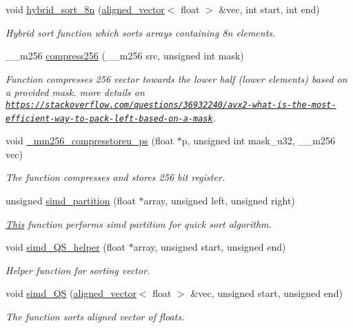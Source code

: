 \begin{DoxyCompactItemize}
void \mbox{\hyperlink{namespaceHYBRID__SORT_a3bac6bc8803474e11924ceb1bc74e1ab}{hybrid\+\_\+sort\+\_\+8n}} (\mbox{\hyperlink{type__definitions_8hpp_a087efd587d66b881646ef378f1919c90}{aligned\+\_\+vector}}$<$ float $>$ \&vec, int start, int end)
\begin{DoxyCompactList}\small\item\em Hybrid sort function which sorts arrays containing 8n elements. \end{DoxyCompactList}\item 
\+\_\+\+\_\+m256 \mbox{\hyperlink{namespaceHYBRID__SORT_ae0a55558c1a67782f1bd0566bb19a185}{compress256}} (\+\_\+\+\_\+m256 src, unsigned int mask)
\begin{DoxyCompactList}\small\item\em Function compresses 256 vector towards the lower half (lower elements) based on a provided mask.  more details on \href{https://stackoverflow.com/questions/36932240/avx2-what-is-the-most-efficient-way-to-pack-left-based-on-a-mask}{\tt https\+://stackoverflow.\+com/questions/36932240/avx2-\/what-\/is-\/the-\/most-\/efficient-\/way-\/to-\/pack-\/left-\/based-\/on-\/a-\/mask}. \end{DoxyCompactList}\item 
void \mbox{\hyperlink{namespaceHYBRID__SORT_ad08b967128fe09cc0a71ec0d908af2eb}{\+\_\+mm256\+\_\+compresstoreu\+\_\+ps}} (float $\ast$p, unsigned int mask\+\_\+u32, \+\_\+\+\_\+m256 vec)
\begin{DoxyCompactList}\small\item\em The function compresses and stores 256 bit register. \end{DoxyCompactList}\item 
unsigned \mbox{\hyperlink{namespaceHYBRID__SORT_a0fc451064018d2d6b471559c839ae865}{simd\+\_\+partition}} (float $\ast$array, unsigned left, unsigned right)
\begin{DoxyCompactList}\small\item\em \mbox{\hyperlink{classThis}{This}} function performs simd partition for quick sort algorithm. \end{DoxyCompactList}\item 
void \mbox{\hyperlink{namespaceHYBRID__SORT_a6705c4bab0c4a4d439364440103a4647}{simd\+\_\+\+Q\+S\+\_\+helper}} (float $\ast$array, unsigned start, unsigned end)
\begin{DoxyCompactList}\small\item\em Helper function for sorting vector. \end{DoxyCompactList}\item 
void \mbox{\hyperlink{namespaceHYBRID__SORT_a6e4b9db525ba745c52e4f4add231b28e}{simd\+\_\+\+QS}} (\mbox{\hyperlink{type__definitions_8hpp_a087efd587d66b881646ef378f1919c90}{aligned\+\_\+vector}}$<$ float $>$ \&vec, unsigned start, unsigned end)
\begin{DoxyCompactList}\small\item\em The function sorts aligned vector of floats. \end{DoxyCompactList}\end{DoxyCompactItemize}
